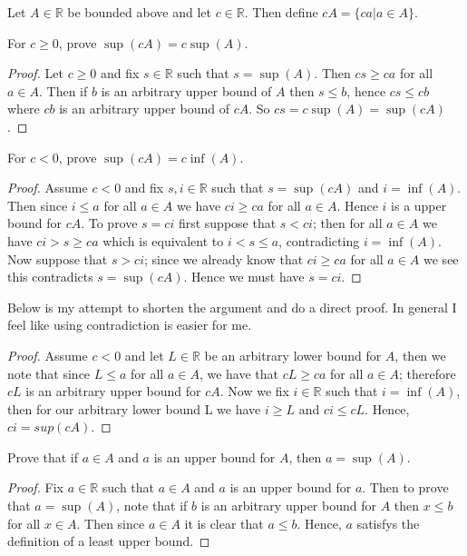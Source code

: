 \documentclass[11pt,largemargins]{homework}
\newcommand{\R}{\mathbb{R}}
\begin{document}
\question
Let $A \in \R$ be bounded above and let $c \in \R$. Then define $cA = \{ ca | a \in A \} $. 

\begin{alphaparts}
    \questionpart
    For $c \geq 0$, prove $\sup(cA) = c\sup(A)$. 

    \begin{proof}
        Let $c  \geq 0$ and fix $s \in \R$ such that $s = \sup(A)$. Then $cs \geq ca $ for all $a \in A$. Then if $b$ is an arbitrary upper bound of $A$ then 
        $s \leq b$, hence $cs \leq cb$ where $cb$ is an arbitrary upper bound of $cA$. So  $cs = c\sup(A) = \sup(cA)$.
    \end{proof}

    \questionpart
    For $c < 0$, prove $\sup(cA) = c\inf(A)$. 

    \begin{proof}
        Assume $c < 0 $ and fix $s, i \in \R$ such that $s = \sup(cA)$ and $i = \inf(A)$. Then since $i \leq a$ for all $a \in A$ we have 
        $ci \geq ca$ for all $a \in A$. Hence $i$ is a upper bound for $cA$. To prove $s = ci$ first suppose that $s < ci$; then
        for all $a \in A$ we have $ci > s \geq ca$ which is equivalent to $i < s \leq a$, contradicting $i = \inf(A)$. Now suppose that 
        $s > ci$; since we already know that $ci \geq ca$ for all $a \in A$ we see this contradicts $s = \sup(cA)$. Hence we must have $s = ci$. 

    \end{proof}

    Below is my attempt to shorten the argument and do a direct proof. In general I feel like using contradiction is easier for me. 
    \begin{proof}
        Assume $c < 0$ and let $L \in \R$ be an arbitrary lower bound for $A$, then we note that since $L \leq a$ for all $a \in A$, we have that 
        $cL \geq ca$ for all $a \in A$; therefore $cL$ is an arbitrary upper bound for $cA$. Now we fix $i \in \R$ such that $i = \inf(A)$, then for our arbitrary lower bound L we have $i \geq L$ and $ci \leq cL$. Hence, $ci = sup(cA)$. 
    \end{proof}
\end{alphaparts}

\question
Prove that if $a \in A$ and $a$ is an upper bound for $A$, then $a = \sup(A)$. 

\begin{proof}
    Fix $a \in \R$ such that $a \in A$ and $a$ is an upper bound for $a$. Then to prove that $a = \sup(A)$, note that 
    if $b$ is an arbitrary upper bound for $A$ then $x \leq b$ for all $x \in A$. Then since $a \in A$ it is clear that $a \leq b$. 
    Hence, $a$ satisfys the definition of a least upper bound. 
\end{proof}
\end{document}
